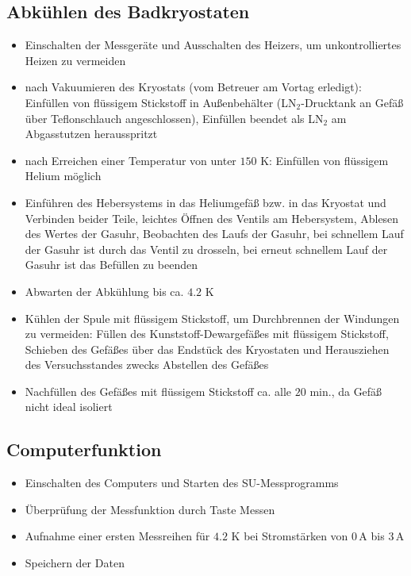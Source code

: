 \documentclass[german,  %
parskip=full,  %
]{scrartcl}
\begin{document}
\subsection{Abkühlen des Badkryostaten}
\begin{itemize}
\item Einschalten der Messgeräte und Ausschalten des Heizers, um unkontrolliertes Heizen zu vermeiden
\item nach Vakuumieren des Kryostats (vom Betreuer am Vortag erledigt): Einfüllen von flüssigem Stickstoff in Außenbehälter (LN$_{2}$-Drucktank an Gefäß über Teflonschlauch angeschlossen), Einfüllen beendet als LN$_{2}$ am Abgasstutzen herausspritzt
\item nach Erreichen einer Temperatur von unter $150$ K: Einfüllen von flüssigem Helium möglich
\item Einführen des Hebersystems in das Heliumgefäß bzw. in das Kryostat und Verbinden beider Teile, leichtes Öffnen des Ventils am Hebersystem, Ablesen des Wertes der Gasuhr, Beobachten des Laufs der Gasuhr, bei schnellem Lauf der Gasuhr ist durch das Ventil zu drosseln, bei erneut schnellem Lauf der Gasuhr ist das Befüllen zu beenden
\item Abwarten der Abkühlung bis ca. $4.2$ K
\item Kühlen der Spule mit flüssigem Stickstoff, um Durchbrennen der Windungen zu vermeiden: Füllen des Kunststoff-Dewargefäßes mit flüssigem Stickstoff, Schieben des Gefäßes über das Endstück des Kryostaten und Herausziehen des Versuchsstandes zwecks Abstellen des Gefäßes
\item Nachfüllen des Gefäßes mit flüssigem Stickstoff ca. alle $20$ min., da Gefäß nicht ideal isoliert
\end{itemize}

\subsection{Computerfunktion}
\begin{itemize}
\item Einschalten des Computers und Starten des SU-Messprogramms
\item Überprüfung der Messfunktion durch Taste Messen
\item Aufnahme einer ersten Messreihen für $4.2$ K bei Stromstärken von $0$\,A bis $3$\,A
\item Speichern der Daten
\end{itemize}
\end{document}
